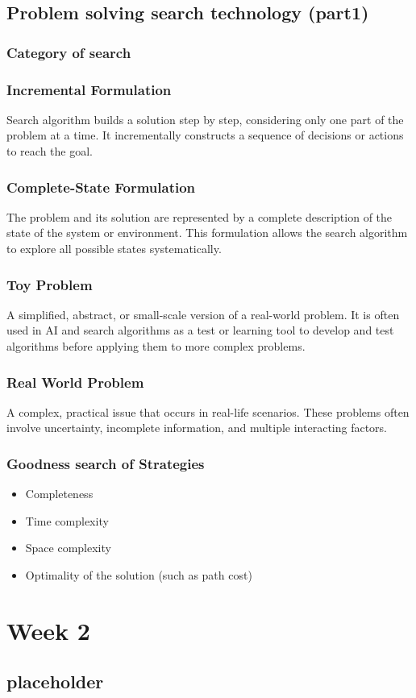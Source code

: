 \documentclass[a4paper, 12pt]{article}
\begin{document}
    \subsection{Problem solving search technology (part1)}
    \subsubsection{Category of search}
        \subsubsection*{Incremental Formulation}
        Search algorithm builds a solution step by step, considering only one part of the problem at a time. It incrementally constructs a sequence of decisions or actions to reach the goal.
        \subsubsection*{Complete-State Formulation}
        The problem and its solution are represented by a complete description of the state of the system or environment. This formulation allows the search algorithm to explore all possible states systematically.
        \subsubsection*{Toy Problem}
        A simplified, abstract, or small-scale version of a real-world problem. It is often used in AI and search algorithms as a test or learning tool to develop and test algorithms before applying them to more complex problems.
        \subsubsection*{Real World Problem}
        A complex, practical issue that occurs in real-life scenarios. These problems often involve uncertainty, incomplete information, and multiple interacting factors.
    \subsubsection{Goodness search of Strategies}
    \begin{itemize}
        \item Completeness
        \item Time complexity
        \item Space complexity
        \item Optimality of the solution (such as path cost)
    \end{itemize}
    
\newpage
\section{Week 2}
    \subsection{placeholder}
\end{document}
